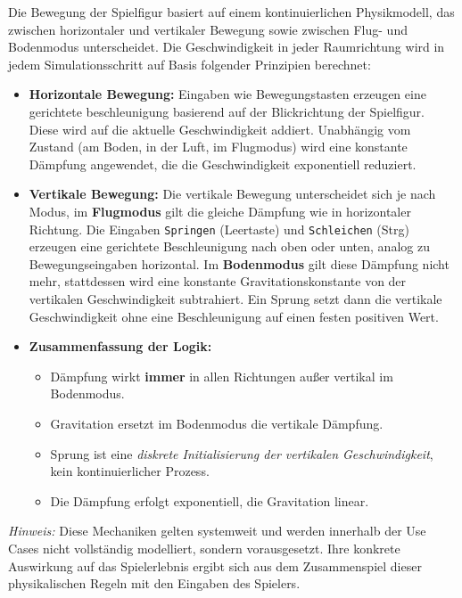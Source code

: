 \documentclass{article}
\begin{document}
Die Bewegung der Spielfigur basiert auf einem kontinuierlichen Physikmodell, das zwischen horizontaler und vertikaler Bewegung sowie zwischen Flug- und Bodenmodus unterscheidet. Die Geschwindigkeit in jeder Raumrichtung wird in jedem Simulationsschritt auf Basis folgender Prinzipien berechnet:

\begin{itemize}
  \item \textbf{Horizontale Bewegung:}  Eingaben wie Bewegungstasten erzeugen eine gerichtete beschleunigung basierend auf der Blickrichtung der Spielfigur. Diese wird auf die aktuelle Geschwindigkeit addiert. Unabhängig vom Zustand (am Boden, in der Luft, im Flugmodus) wird eine konstante Dämpfung angewendet, die die Geschwindigkeit exponentiell reduziert.

  \item \textbf{Vertikale Bewegung:}  Die vertikale Bewegung unterscheidet sich je nach Modus, im \textbf{Flugmodus} gilt die gleiche Dämpfung wie in horizontaler Richtung. Die Eingaben \texttt{Springen} (Leertaste) und \texttt{Schleichen} (Strg) erzeugen eine gerichtete Beschleunigung nach oben oder unten, analog zu Bewegungseingaben horizontal. Im \textbf{Bodenmodus} gilt diese Dämpfung nicht mehr, stattdessen wird eine konstante Gravitationskonstante von der vertikalen Geschwindigkeit subtrahiert. Ein Sprung setzt dann die vertikale Geschwindigkeit ohne eine Beschleunigung auf einen festen positiven Wert.

  \item \textbf{Zusammenfassung der Logik:}
  \begin{itemize}
    \item Dämpfung wirkt \textbf{immer} in allen Richtungen außer vertikal im Bodenmodus.
    \item Gravitation ersetzt im Bodenmodus die vertikale Dämpfung.
    \item Sprung ist eine \textit{diskrete Initialisierung der vertikalen Geschwindigkeit}, kein kontinuierlicher Prozess.
    \item Die Dämpfung erfolgt exponentiell, die Gravitation linear.
  \end{itemize}
\end{itemize}

\textit{Hinweis:} Diese Mechaniken gelten systemweit und werden innerhalb der Use Cases nicht vollständig modelliert, sondern vorausgesetzt. Ihre konkrete Auswirkung auf das Spielerlebnis ergibt sich aus dem Zusammenspiel dieser physikalischen Regeln mit den Eingaben des Spielers.
\end{document}
